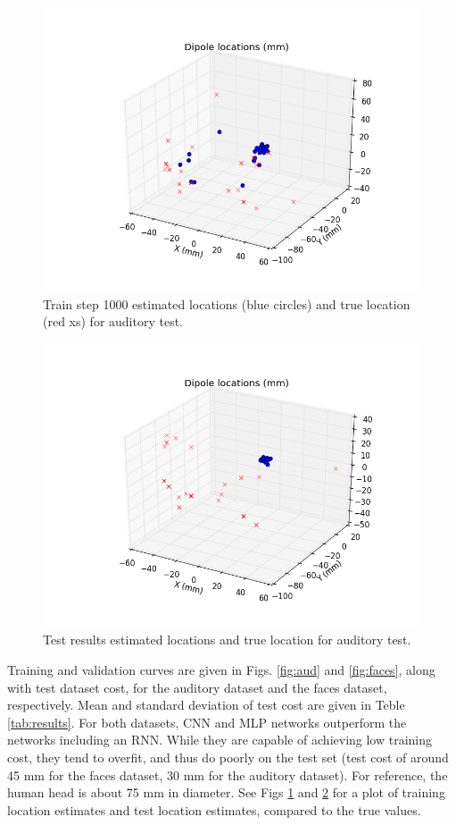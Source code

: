 \documentclass[journal,12pt,onecolumn,draftclsnofoot]{IEEEtran}
\begin{document}
\begin{figure}[h!]
\centering
\includegraphics[width=5in]{finalplots/tf1_0_subject_aud_pca_all_True_rand_True_cnn_True_rnn_False_locate_1_treat_None_train_1000}
\caption{Train step 1000 estimated locations (blue circles) and true location (red xs) for auditory test.}
\label{fig:audloc}
\end{figure}


\begin{figure}[h!]
\centering
\includegraphics[width=5in]{finalplots/tf1_0_subject_aud_pca_all_True_rand_True_cnn_True_rnn_False_locate_1_treat_None}
\caption{Test results estimated locations and true location for auditory test.}
\label{fig:audloctest}
\end{figure}

Training and validation curves are given in Figs. \ref{fig:aud} and \ref{fig:faces}, along with test dataset cost, for the auditory dataset and the faces dataset, respectively. Mean and standard deviation of test cost are given in Teble \ref{tab:results}. For both datasets, CNN and MLP networks outperform the networks including an RNN. While they are capable of achieving low training cost, they tend to overfit, and thus do poorly on the test set (test cost of around 45 mm for the faces dataset, 30 mm for the auditory dataset). For reference, the human head is about 75 mm in diameter. See Figs \ref{fig:audloc} and \ref{fig:audloctest} for a plot of training location estimates and test location estimates, compared to the true values.
\end{document}
